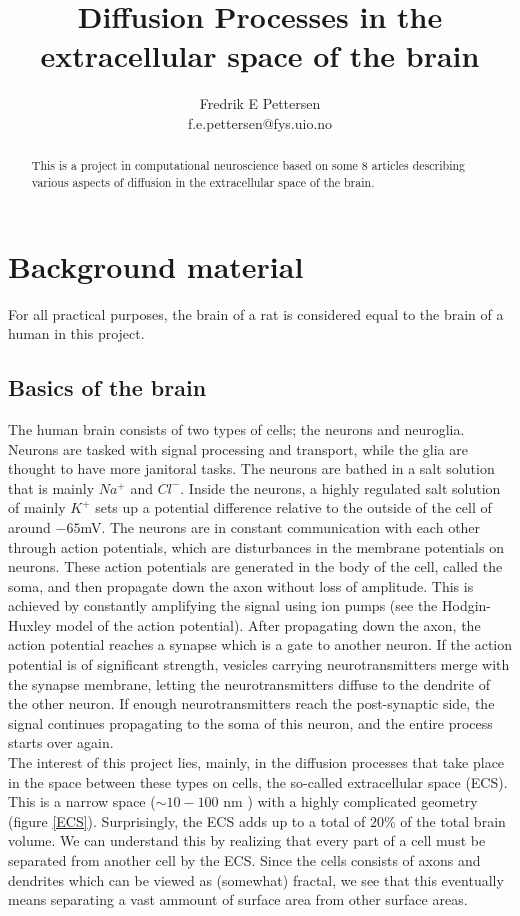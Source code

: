 \documentclass[a4paper,english, 12pt, twoside]{article}
\title{Diffusion Processes in the extracellular space of the brain}
\author{Fredrik E Pettersen\\ f.e.pettersen@fys.uio.no}
\begin{document}
\maketitle

\begin{abstract}
This is a project in computational neuroscience based on some 8 articles describing various aspects of diffusion in the extracellular space of the brain. 
\end{abstract}
\tableofcontents
\newpage
\section{Background material}
For all practical purposes, the brain of a rat is considered equal to the brain of a human in this project.
\subsection{Basics of the brain}

The human brain consists of two types of cells; the neurons and neuroglia. 
Neurons are tasked with signal processing and transport, while the glia are thought to have more janitoral tasks. 
The neurons are bathed in a salt solution that is mainly $Na^+$ and $Cl^-$. 
Inside the neurons, a highly regulated salt solution of mainly $K^+$ sets up a potential difference relative to the outside of the cell of around $-65$mV.
The neurons are in constant communication with each other through action potentials, which are disturbances in the membrane potentials on neurons. 
These action potentials are generated in the body of the cell, called the soma, and then propagate down the axon without loss of amplitude. 
This is achieved by constantly amplifying the signal using ion pumps (see the Hodgin-Huxley model of the action potential).
After propagating down the axon, the action potential reaches a synapse which is a gate to another neuron. 
If the action potential is of significant strength, vesicles carrying neurotransmitters merge with the synapse membrane, letting the neurotransmitters diffuse to the dendrite of the other neuron. 
If enough neurotransmitters reach the post-synaptic side, the signal continues propagating to the soma of this neuron, and the entire process starts over again. \\
The interest of this project lies, mainly, in the diffusion processes that take place in the space between these types on cells, the so-called extracellular space (ECS). 
This is a narrow space ($\sim 10-100$ nm \cite{nicholson2001diffusion}) with a highly complicated geometry (figure \ref{ECS}). 
Surprisingly, the ECS adds up to a total of $20\%$ of the total brain volume. 
We can understand this by realizing that every part of a cell must be separated from another cell by the ECS. 
Since the cells consists of axons and dendrites which can be viewed as (somewhat) fractal, we see that this eventually means separating a vast ammount of surface area from other surface areas.
\end{document}
